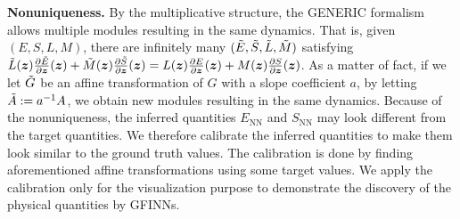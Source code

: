 \documentclass[openacc]{rsproca_new}%
\newcommand{\z}{\bm{z}}
\begin{document}
\textbf{Nonuniqueness.}
By the multiplicative structure,
the GENERIC formalism allows multiple modules 
resulting in the same dynamics. 
That is, 
given $(E,S,L,M)$,
there are infinitely many 
$(\Tilde{E},\Tilde{S},\Tilde{L},\Tilde{M})$ satisfying
$\Tilde{L}(\z)\frac{\partial \Tilde{E}}{\partial \z}(\z) + \Tilde{M}(\z)\frac{\partial \Tilde{S}}{\partial \z}(\z)
    =
    L(\z)\frac{\partial E}{\partial \z}(\z) + M(\z)\frac{\partial S}{\partial \z}(\z)$.
As a matter of fact,  
if we let $\Tilde{G}$ be an affine transformation of $G$
with a slope coefficient $a$,
by letting $\Tilde{A} := a^{-1}A$,
we obtain new modules resulting in the same dynamics.
Because of the nonuniqueness, 
the inferred quantities $E_{\text{NN}}$ and $S_{\text{NN}}$
may look different from the target quantities.
We therefore calibrate the inferred quantities 
to make them look similar to the ground truth values.
The calibration is done by finding aforementioned affine transformations using some target values.
We apply the calibration only for the visualization purpose
to demonstrate the discovery of the physical quantities by GFINNs.
\end{document}
